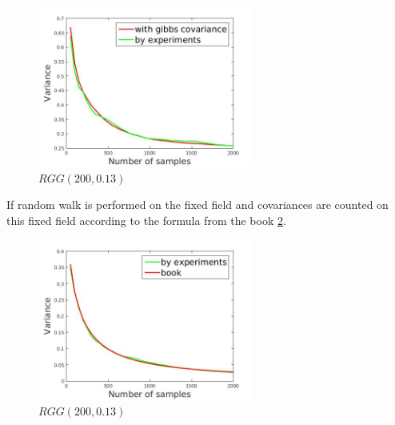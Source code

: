 \documentclass[12pt]{report}
\begin{document}
\begin{figure}[ht]
    \centering
    \includegraphics[height=200px]{varExperGibbsGood}
    \caption{ $RGG (200, 0.13)$}
    \label{fig:var2}
\end{figure}

If random walk is performed on the fixed field and covariances are counted on this fixed field according to the formula from the book \ref{fig:var3}. 

\begin{figure}[ht]
    \centering
    \includegraphics[height=200px]{varExperBook}
    \caption{ $RGG (200, 0.13)$}
    \label{fig:var3}
\end{figure}

 
\end{document}

